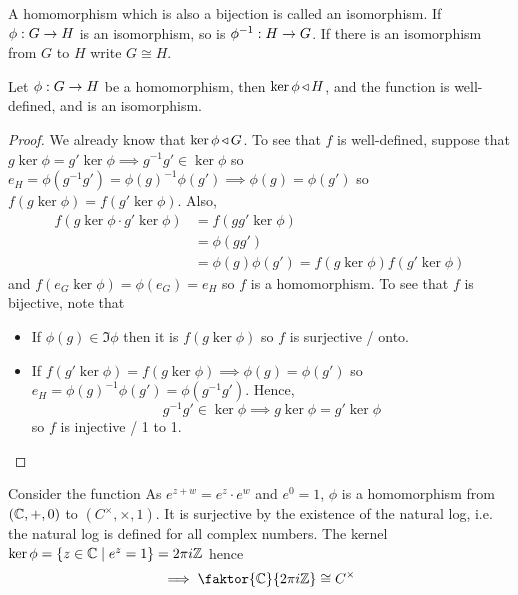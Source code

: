 \documentclass{article}
\begin{document}
\begin{defi}[Isomorphism]
    A homomorphism which is also a bijection is called an isomorphism.
    If ${\phi : G \rightarrow H}$ is an isomorphism, so is ${\phi^{-1} : H \rightarrow G}$. If there is an isomorphism from $G$ to $H$ write $G \cong H$.
\end{defi}

\begin{thm}
    Let ${\phi : G \rightarrow H}$ be a homomorphism, then $\ker \phi \operatorname{\triangleleft} H$, and the function 
    is well-defined, and is an isomorphism.
\end{thm}
\begin{proof}
    We already know that $\ker \phi \operatorname{\triangleleft} G$. To see that $f$ is well-defined, suppose that $ g \ker \phi = g' \ker \phi \implies g^{-1}g' \in \ker \phi $
    so $ e_H = \phi(g^{-1}g') = \phi(g)^{-1}\phi(g') \implies \phi(g) = \phi(g')$ so $f(g \ker \phi) = f(g' \ker \phi)$.
    Also, 
    \begin{align*}
        f(g \ker \phi \cdot g' \ker \phi) &= f(g g' \ker \phi) \\
            &= \phi(gg') \\
            &= \phi(g) \phi(g') =f(g \ker \phi)f(g' \ker \phi)
    \end{align*}
    and $f(e_G \ker \phi) = \phi(e_G) = e_H$ so $f$ is a homomorphism. To see that $f$ is bijective, note that
    \begin{itemize}
        \item If $\phi(g) \in \Im \phi$ then it is $f(g \ker \phi)$ so $f$ is surjective / onto.
        \item If $f(g' \ker \phi) = f(g \ker \phi) \implies \phi(g) = \phi(g')$ so $e_H = \phi(g)^{-1}\phi(g') = \phi(g^{-1}g')$. 
        Hence, $$ g^{-1}g' \in \ker \phi \implies g\ker\phi = g'\ker\phi$$ so $f$ is injective / 1 to 1.
    \end{itemize}
\end{proof}

\begin{eg}
    Consider the function 
    As $e^{z + w} = e^z \cdot e^w$ and $e^0 = 1$, $\phi$ is a homomorphism from $(\mathbb{C}, +, 0)$ to $(C^{\times}, \times, 1)$.
    It is surjective by the existence of the natural log, i.e. the natural log is defined for all complex numbers.
    The kernel $ \ker \phi = \left\{ z \in \mathbb{C} \mid e^z = 1 \right\} = 2\pi i \mathbb{Z} $ hence $$\implies \faktor{\C}{2\pi i \Z} \cong C^{\times}$$ 
\end{eg}
\end{document}
